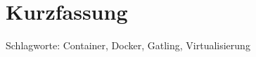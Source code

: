 \chapter*{Kurzfassung}
\thispagestyle{empty}

\bigskip



\noindent

\vspace*{\fill}
Schlagworte: 
Container, Docker, Gatling, Virtualisierung
